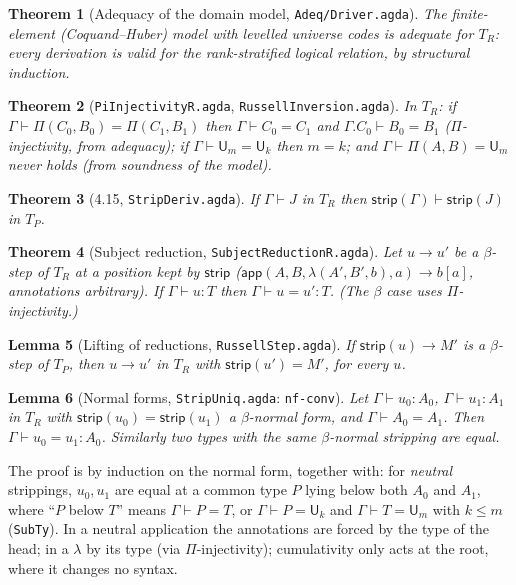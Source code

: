 \documentclass[10pt]{article}
\newcommand{\U}{\mathsf{U}}
\newcommand{\lam}{\lambda}
\newcommand{\app}{\mathsf{app}}
\newcommand{\strip}{\mathsf{strip}}
\newcommand{\TR}{T_R}
\newcommand{\TP}{T_P}
\newcommand{\agda}[1]{\texttt{#1}}
\newtheorem{theorem}{Theorem}
\newtheorem{lemma}[theorem]{Lemma}
\theoremstyle{remark}
\begin{document}
\begin{theorem}[Adequacy of the domain model, \agda{Adeq/Driver.agda}]
The finite-element (Coquand--Huber) model with levelled universe codes is
adequate for $\TR$: every derivation is valid for the rank-stratified
logical relation, by structural induction.
\end{theorem}

\begin{theorem}[\agda{PiInjectivityR.agda}, \agda{RussellInversion.agda}]
In $\TR$: if $\Gamma\vdash\Pi(C_0,B_0)=\Pi(C_1,B_1)$ then
$\Gamma\vdash C_0=C_1$ and $\Gamma.C_0\vdash B_0=B_1$ ($\Pi$-injectivity,
from adequacy); if $\Gamma\vdash\U_m=\U_k$ then $m=k$; and
$\Gamma\vdash\Pi(A,B)=\U_m$ never holds (from soundness of the model).
\end{theorem}

\begin{theorem}[4.15, \agda{StripDeriv.agda}]
If $\Gamma\vdash J$ in $\TR$ then $\strip(\Gamma)\vdash\strip(J)$ in $\TP$.
\end{theorem}

\begin{theorem}[Subject reduction, \agda{SubjectReductionR.agda}]
Let $u\to u'$ be a $\beta$-step of $\TR$ at a position kept by $\strip$
($\app(A,B,\lam(A',B',b),a)\to b[a]$, annotations arbitrary).  If
$\Gamma\vdash u:T$ then $\Gamma\vdash u=u':T$.  (The $\beta$ case uses
$\Pi$-injectivity.)
\end{theorem}

\begin{lemma}[Lifting of reductions, \agda{RussellStep.agda}]
If $\strip(u)\to M'$ is a $\beta$-step of $\TP$, then $u\to u'$ in $\TR$ with
$\strip(u')=M'$, for \emph{every} $u$.
\end{lemma}

\begin{lemma}[Normal forms, \agda{StripUniq.agda}: \agda{nf-conv}]
Let $\Gamma\vdash u_0:A_0$, $\Gamma\vdash u_1:A_1$ in $\TR$ with
$\strip(u_0)=\strip(u_1)$ a $\beta$-normal form, and $\Gamma\vdash A_0=A_1$.
Then $\Gamma\vdash u_0=u_1:A_0$.  Similarly two types with the same
$\beta$-normal stripping are equal.
\end{lemma}
\noindent
The proof is by induction on the normal form, together with: for
\emph{neutral} strippings, $u_0,u_1$ are equal at a common type $P$ lying below
both $A_0$ and $A_1$, where ``$P$ below $T$'' means $\Gamma\vdash P=T$, or
$\Gamma\vdash P=\U_k$ and $\Gamma\vdash T=\U_m$ with $k\le m$
(\agda{SubTy}).  In a neutral application the annotations are forced by the
type of the head; in a $\lam$ by its type (via $\Pi$-injectivity);
cumulativity only acts at the root, where it changes no syntax.
\end{document}
